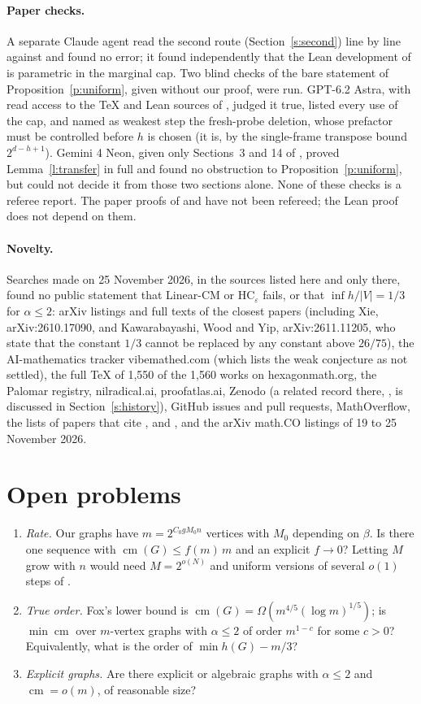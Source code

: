 \documentclass[11pt]{article}
\theoremstyle{definition}\newtheorem{conjecture}[theorem]{Conjecture}
\theoremstyle{remark}\newtheorem{remark}[theorem]{Remark}
\newcommand{\cm}{\operatorname{cm}}
\newcommand{\eps}{\varepsilon}
\begin{document}
\paragraph{Paper checks.} A separate Claude agent read the second route (Section~\ref{s:second}) line by line against
\cite{OAIC} and found no error; it found independently that the Lean development of \cite{OAIH} is parametric in the
marginal cap. Two blind checks of the bare statement of Proposition~\ref{p:uniform}, given without our proof, were run.
GPT-6.2 Astra, with read access to the TeX and Lean sources of \cite{OAIH}, judged it true, listed every use of the cap, and
named as weakest step the fresh-probe deletion, whose prefactor must be controlled before $h$ is chosen (it is, by the
single-frame transpose bound $2^{d-h+1}$). Gemini 4 Neon, given only Sections~3 and 14 of \cite{OAIH}, proved
Lemma~\ref{l:transfer} in full and found no obstruction to Proposition~\ref{p:uniform}, but could not decide it from those two
sections alone. None of these checks is a referee report. The paper proofs of \cite{OAIH} and \cite{OAIC} have not been
refereed; the Lean proof does not depend on them.

\paragraph{Novelty.} Searches made on 25 November 2026, in the sources listed here and only there, found no public
statement that Linear-CM or $\mathrm{HC}_\eps$ fails,
or that $\inf h/|V|=1/3$ for $\alpha\le2$: arXiv listings and full texts of the closest papers (including Xie,
arXiv:2610.17090, and Kawarabayashi, Wood and Yip, arXiv:2611.11205, who state that the constant $1/3$ cannot be replaced by
any constant above $26/75$), the AI-mathematics tracker vibemathed.com (which lists the weak conjecture as not settled),
the full \TeX{} of 1,550 of the 1,560 works on hexagonmath.org, the Palomar registry, nilradical.ai, proofatlas.ai, Zenodo
(a related record there, \cite{MD}, is discussed in Section~\ref{s:history}),
GitHub issues and pull requests, MathOverflow, the lists of papers that cite \cite{FGS}, \cite{Fox} and \cite{KPT}, and the
arXiv math.CO listings of 19 to 25 November 2026.

\section{Open problems}
\begin{enumerate}
\item \emph{Rate.} Our graphs have $m=2^{C_0gM_0n}$ vertices with $M_0$ depending on $\beta$. Is there one sequence with
$\cm(G)\le f(m)\,m$ and an explicit $f\to0$? Letting $M$ grow with $n$ would need $M=2^{o(N)}$ and uniform versions of several
$o(1)$ steps of \cite{OAIH}.
\item \emph{True order.} Fox's lower bound is $\cm(G)=\Omega(m^{4/5}(\log m)^{1/5})$; is $\min\cm$ over $m$-vertex graphs with
$\alpha\le2$ of order $m^{1-c}$ for some $c>0$? Equivalently, what is the order of $\min h(G)-m/3$?
\item \emph{Explicit graphs.} Are there explicit or algebraic graphs with $\alpha\le2$ and $\cm=o(m)$, of reasonable size?
\end{enumerate}
\end{document}
